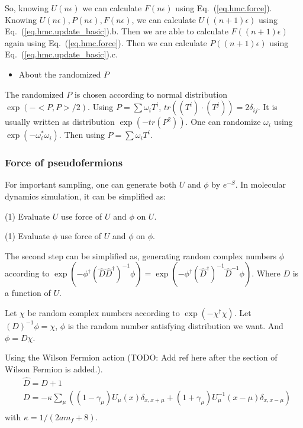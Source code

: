 So, knowing $U(n\epsilon)$ we can calculate $F(n\epsilon)$ using Eq.~(\ref{eq.hmc.force}).
Knowing $U(n\epsilon),P(n\epsilon),F(n\epsilon)$, we can calculate $U((n+1)\epsilon)$ using Eq.~(\ref{eq.hmc.update_basic}).b.
Then we are able to calculate $F((n+1)\epsilon)$ again using Eq.~(\ref{eq.hmc.force}).
Then we can calculate $P((n+1)\epsilon)$ using Eq.~(\ref{eq.hmc.update_basic}).c.

\begin{itemize}
  \item About the randomized $P$
\end{itemize}

The randomized $P$ is chosen according to normal distribution $\exp \left(-<P,P>/2\right)$. Using $P=\sum \omega _i T^i$, $tr((T^i)\cdot (T^j))=2\delta _{ij}$. It is usually written as distribution $\exp \left(-tr(P^2)\right)$. One can randomize $\omega _i$ using $\exp \left(-\omega_i^*\omega_i\right)$. Then using $P=\sum \omega _i T^i$.

\subsubsection{\label{forceOfPseudofermions}Force of pseudofermions}

For important sampling, one can generate both $U$ and $\phi$ by $e^{-S}$. In molecular dynamics simulation, it can be simplified as:

(1) Evaluate $U$ use force of $U$ and $\phi$ on $U$.

(1) Evaluate $\phi$ use force of $U$ and $\phi$ on $\phi$.

The second step can be simplified as, generating random complex numbers $\phi$ according to $\exp (-\phi^{\dagger} \left(\hat{D}\hat{D}^{\dagger}\right)^{-1}\phi)=\exp (-\phi^{\dagger}(\hat{D}^{\dagger})^{-1} \hat{D}^{-1}\phi)$. Where $D$ is a function of $U$.

Let $\chi$ be random complex numbers according to $\exp (-\chi ^{\dagger}\chi)$. Let $(D)^{-1}\phi=\chi$, $\phi$ is the random number satisfying distribution we want. And $\phi = D\chi$.

Using the Wilson Fermion action \textcolor[rgb]{0,0,1}{(TODO: Add ref here after the section of Wilson Fermion is added.)}.
\begin{equation}
\begin{split}
&\hat{D}=D+1\\
&D=-\kappa\sum _{\mu}\left((1-\gamma _{\mu})U_{\mu}(x)\delta _{x,x+\mu}+(1+\gamma _{\mu})U_{\mu}^{-1}(x-\mu)\delta _{x,x-\mu}\right)\\
\end{split}
\end{equation}
with $\kappa=1/(2am_f+8)$.

